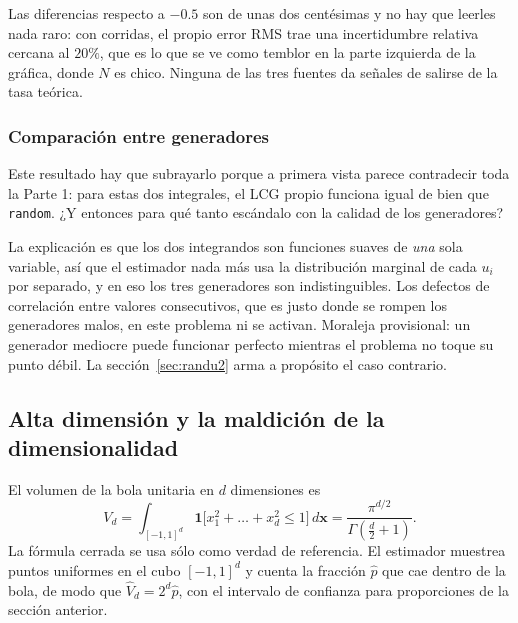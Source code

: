 \documentclass[11pt,letterpaper]{article}
\newcommand{\code}[1]{\texttt{#1}}
\begin{document}
Las diferencias respecto a $-0.5$ son de unas dos centésimas y no hay que
leerles nada raro: con \Repeticiones{} corridas, el propio error RMS trae una
incertidumbre relativa cercana al $20\%$, que es lo que se ve como temblor en
la parte izquierda de la gráfica, donde $N$ es chico. Ninguna de las tres
fuentes da señales de salirse de la tasa teórica.

\subsubsection{Comparación entre generadores} Este resultado hay que subrayarlo
porque a primera vista parece contradecir toda la Parte 1: para estas dos
integrales, el LCG propio funciona igual de bien que \code{random}. ¿Y
entonces para qué tanto escándalo con la calidad de los generadores?

La explicación es que los dos integrandos son funciones suaves de \emph{una}
sola variable, así que el estimador nada más usa la distribución marginal de
cada $u_i$ por separado, y en eso los tres generadores son indistinguibles.
Los defectos de correlación entre valores consecutivos, que es justo donde se
rompen los generadores malos, en este problema ni se activan. Moraleja
provisional: un generador mediocre puede funcionar perfecto mientras el
problema no toque su punto débil. La sección~\ref{sec:randu2} arma a
propósito el caso contrario.

\subsection{Alta dimensión y la maldición de la dimensionalidad}
\label{sec:altadim}

El volumen de la bola unitaria en $d$ dimensiones es
\begin{equation}
V_d = \int_{[-1,1]^d} \mathbf{1}\big[x_1^2+\dots+x_d^2 \le 1\big]\,d\mathbf{x}
= \frac{\pi^{d/2}}{\Gamma\!\left(\frac{d}{2}+1\right)}.
\label{eq:vol}
\end{equation}
La fórmula cerrada se usa sólo como verdad de referencia. El estimador
muestrea puntos uniformes en el cubo $[-1,1]^d$ y cuenta la fracción
$\hat{p}$ que cae dentro de la bola, de modo que $\hat{V}_d = 2^d \hat{p}$,
con el intervalo de confianza para proporciones de la sección anterior.


\end{document}
